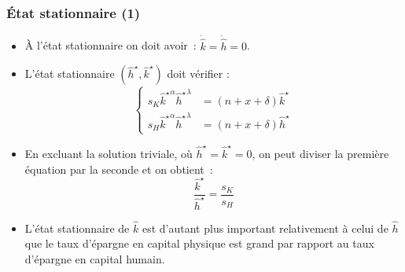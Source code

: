 \documentclass[10pt,notheorems]{beamer}
\theoremstyle{plain}
\theoremstyle{definition} %
\begin{document}
\begin{frame}
  \frametitle{État stationnaire (1)}

  \begin{itemize}

  \item À l'état stationnaire on doit avoir~: $\dot{\hat k} = \dot{\hat h} = 0$.\newline

  \item L'état stationnaire $(\hat h^\star, \hat k^\star)$ doit vérifier :
    \[
      \begin{cases}
        s_K \left.\hat k^\star\right.^\alpha \left.\hat h^\star\right.^\lambda  &=  (n+x+\delta) \hat k^\star \\
        s_H \left. \hat k^\star\right.^\alpha \left.\hat h^\star\right.^\lambda  &=  (n+x+\delta) \hat h^\star
      \end{cases}
    \]

    \medskip

  \item En excluant la solution triviale, où $\hat h^\star=\hat k^\star=0$, on peut diviser la première équation par la seconde et on obtient~:
    \[
      \frac{\hat k^\star}{\hat h^\star} = \frac{s_K}{s_H}
    \]

    \medskip

  \item L'état stationnaire de $\hat k$ est d'autant plus important relativement à celui de $\hat h$ que le taux d'épargne en capital physique est grand par rapport au taux d'épargne en capital humain.

  \end{itemize}

\end{frame}
\end{document}

